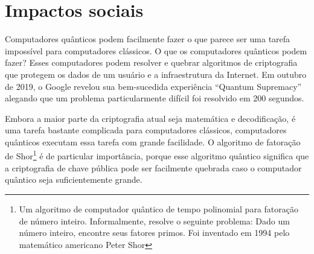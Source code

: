 \section{Impactos sociais}
Computadores quânticos podem facilmente fazer o que parece ser uma tarefa impossível para computadores clássicos. O que os computadores quânticos podem fazer? Esses computadores podem resolver e quebrar algoritmos de criptografia que protegem os dados de um usuário e a infraestrutura da Internet. Em outubro de 2019, o Google revelou sua bem-sucedida experiência ``Quantum Supremacy'' alegando que um problema particularmente difícil foi resolvido em 200 segundos.

Embora a maior parte da criptografia atual seja matemática e decodificação, é uma tarefa bastante complicada para computadores clássicos, computadores quânticos executam essa tarefa com grande facilidade. O algoritmo de fatoração de Shor\footnote{Um algoritmo de computador quântico de tempo polinomial para fatoração de número inteiro. Informalmente, resolve o seguinte problema: Dado um número inteiro, encontre seus fatores primos. Foi inventado em 1994 pelo matemático americano Peter Shor} é de particular importância, porque esse algoritmo quântico significa que a criptografia de chave pública pode ser facilmente quebrada caso o computador quântico seja suficientemente grande.
\newpage